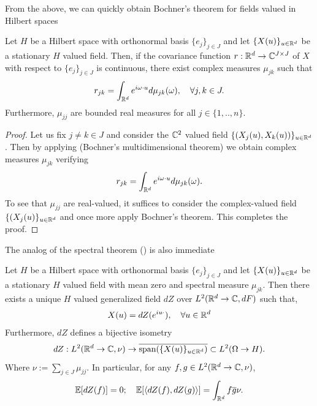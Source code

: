 \documentclass[
    a4paper,
    DIV=14,
    abstract=true,
    numbers=noenddot
]{scrartcl}
\begin{document}
From the above, we can quickly obtain Bochner's theorem for fields valued in Hilbert spaces
\begin{theorem}\label{bochner hilbert}
	Let $H$ be a Hilbert space with orthonormal basis $\{e_j\}_{j\in J}$ and let $\{X(u)\}_{u\in\mathbb{R}^d}$ be a stationary $H$ valued field. Then, if the covariance function $r:\mathbb{R}^d\to \mathbb{C}^{J\times J}$ of $X$ with respect to $\{e_j\}_{j\in J}$  is continuous, there exist complex measures $\mu_{jk}$ such that
	\begin{equation*}
		r_{jk}=\int_{\mathbb{R}^d} e^{i\omega \cdot u} d\mu _{j k}(\omega),\quad \forall j,k\in{J}.
	\end{equation*}
	Furthermore, $\mu_{jj}$ are bounded real measures for all $j\in\{1,..,n\}$.
\end{theorem}
\begin{proof}
	Let us fix $j\neq k\in J$ and consider the $\mathbb{C}^2$ valued field $\{(X_j(u),X_k(u))\}_{u\in\mathbb{R}^d}$. Then by applying  (Bochner's multidimensional theorem) we obtain complex measures $\mu_{jk}$ verifying
	\begin{equation*}
		r_{jk}=\int_{\mathbb{R}^d} e^{i\omega \cdot u} d\mu _{j k}(\omega).
	\end{equation*}
	To  see that $\mu_{jj}$ are real-valued, it suffices to consider the complex-valued field $\{(X_j(u)\}_{u\in\mathbb{R}^d}$ and once more apply Bochner's theorem. This completes the proof.
\end{proof}
The analog of the spectral theorem () is also immediate
\begin{theorem}\label{spectral theorem hilbert}
	Let $H$ be a Hilbert space with orthonormal basis $\{e_j\}_{j\in J}$ and let $\{X(u)\}_{u\in\mathbb{R}^d}$ be a stationary $H$ valued field with mean zero and spectral measure $\mu_{jk}$. Then there exists a unique $H$ valued generalized field $dZ$ over $L^2(\mathbb{R}^d\to \mathbb{C},dF)$ such that,
	\begin{equation}\label{spectral representation2}
		X(u)=dZ(e^{iu\cdot}),\quad\forall u\in\mathbb{R}^d
	\end{equation}
	Furthermore, $dZ$ defines a bijective isometry
	\begin{equation*}
		dZ:L^2(\mathbb{R}^d\to \mathbb{C},\nu)\to\overline{\text{span}(\{X(u)\}_{u\in\mathbb{R}^d})}\subset L^2(\Omega\to H).
	\end{equation*}
	Where $\nu:=\sum_{j\in J} \mu_{jj}$.
	In particular, for any $f,g\in L^2(\mathbb{R}^d\to\mathbb{C},\nu)$,
	\begin{equation}\label{dZ properties2}
		\mathbb{E}[dZ(f)]=0;\quad\mathbb{E}[\left\langle dZ(f),{dZ(g)}\right\rangle]=\int_{\mathbb{R}^d} f\overline{g}\nu.
	\end{equation}
\end{theorem}
\end{document}
